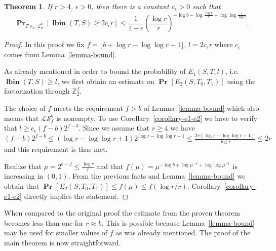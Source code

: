 \documentclass{article}
\newcommand{\lbin}[2]{\operatorname{\mathbf{lbin}}({#1}, {#2})}
\newcommand{\vecspace}[2]{\mathbb{Z}_{#1}^{#2}}
\newcommand{\binvecspace}[1]{\vecspace{2}{#1}}
\newcommand{\linearmaps}[2]{\mathcal{L}_{#1}^{#2}}
\newcommand{\surjectivelinearmaps}[2]{\mathcal{LS}_{#1}^{#2}}
\newcommand{\probs}[2]{\operatorname{\mathbf{Pr}}_{{#1}}\left[{#2}\right]}
\newcommand{\prob}[1]{\probs{}{#1}}
\newtheorem{theorem}{Theorem}
\begin{document}
\begin{theorem}
\label{theorem-prob-distribution-bound}
If $r > 4$, $\epsilon > 0$, then there is a constant $c_\epsilon > 0$ such that
\[
\probs{T \in_U \linearmaps{u}{b}}{\lbin{T}{S} \geq 2 c_\epsilon r} \leq \frac{1}{1 - \epsilon}\left(\frac{\log r}{r}\right)^{-\log b - \log \frac{\log r}{r} + \log \log \frac{r}{\log r}}.
\]
\end{theorem}
\begin{proof}
In this proof we fix $f = \lfloor b + \log r - \log \log r + 1 \rfloor$, $l = 2c_\epsilon r$ where $c_\epsilon$ comes from Lemma~\ref{lemma-bound}.

As already mentioned in order to bound the probability of $E_1(S, T, l)$, i.e. $\lbin{T}{S} \geq l$, we first obtain an estimate on $\prob{E_2(S, T_0, T_1)}$ using the factorization through $\binvecspace{f}$. 

The choice of $f$ meets the requirement $f > b$ of Lemma~\ref{lemma-bound} which also means that $\surjectivelinearmaps{f}{b}$ is nonempty.
To use Corollary~\ref{corollary-e1-e2} we have to verify that $l \geq c_\epsilon (f - b)2^{f - b}$.
Since we assume that $r \geq 4$ we have $(f - b)2^{f - b} \leq (\log r - \log \log r + 1)2^{\log r - \log \log r + 1} \leq \frac{2r(\log r - \log \log r + 1)}{\log r} \leq 2r$ and this requirement is thus met.

Realize that $\mu = 2^{b - f} \leq \frac{\log r}{r}$ and that $f(\mu) = \mu ^ {- \log b + \log \mu^{-1} + \log \log \mu^{-1}}$ is increasing in $(0, 1)$.
From the previous facts and Lemma~\ref{lemma-bound} we obtain that $\prob{E_2(S, T_0, T_1)} \leq f(\mu) \leq f(\log r/r)$.
Corollary~\ref{corollary-e1-e2} directly implies the statement.
\end{proof}

When compared to the original proof the estimate from the proven theorem becomes less than one for $r \approx b$. 
This is possible because Lemma~\ref{lemma-bound} may be used for smaller values of $f$ as was already mentioned.
The proof of the main theorem is now straightforward.
\end{document}
